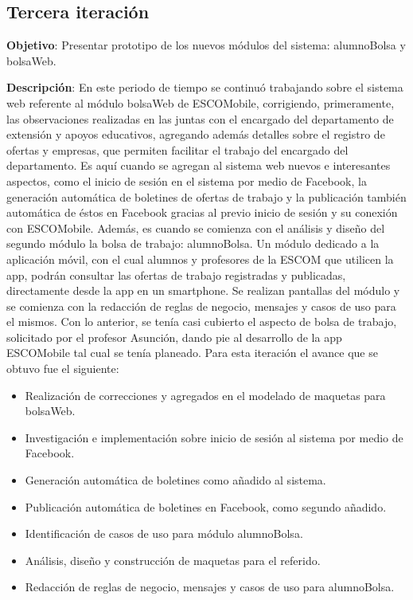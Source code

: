 
\subsection{Tercera iteración}

\noindent
\textbf{Objetivo}: Presentar prototipo de los nuevos módulos del sistema: alumnoBolsa y bolsaWeb.
\newline

\noindent
\textbf{Descripción}: En este periodo de tiempo se continuó trabajando sobre el sistema web referente al módulo bolsaWeb de ESCOMobile, corrigiendo, primeramente, las observaciones realizadas en las juntas con el encargado del departamento de extensión y apoyos educativos, agregando además detalles sobre el registro de ofertas y empresas, que permiten facilitar el trabajo del encargado del departamento. 
\newline
Es aquí cuando se agregan al sistema web nuevos e interesantes aspectos, como el inicio de sesión en el sistema por medio de Facebook, la generación automática de boletines de ofertas de trabajo y la publicación también automática de éstos en Facebook gracias al previo inicio de sesión y su conexión con ESCOMobile.
\newline
\newline
Además, es cuando se comienza con el análisis y diseño del segundo módulo la bolsa de trabajo: alumnoBolsa. Un módulo dedicado a la aplicación móvil, con el cual alumnos y profesores de la ESCOM que utilicen la app, podrán consultar las ofertas de trabajo registradas y publicadas, directamente desde la app en un smartphone. Se realizan pantallas del módulo y se comienza con la redacción de reglas de negocio, mensajes y casos de uso para el mismos.
\newline
Con lo anterior, se tenía casi cubierto el aspecto de bolsa de trabajo, solicitado por el profesor Asunción, dando pie al desarrollo de la app ESCOMobile tal cual se tenía planeado. 
\newline
Para esta iteración el avance que se obtuvo fue el siguiente:
\begin{itemize}
	\item Realización de correcciones y agregados en el modelado de maquetas para bolsaWeb.
	\item Investigación e implementación sobre inicio de sesión al sistema por medio de Facebook.
	\item Generación automática de boletines como añadido al sistema. 
	\item Publicación automática de boletines en Facebook, como segundo añadido.
	\item Identificación de casos de uso para módulo alumnoBolsa.
	\item Análisis, diseño y construcción de maquetas para el referido.
	\item Redacción de reglas de negocio, mensajes y casos de uso para alumnoBolsa.
\end{itemize}


